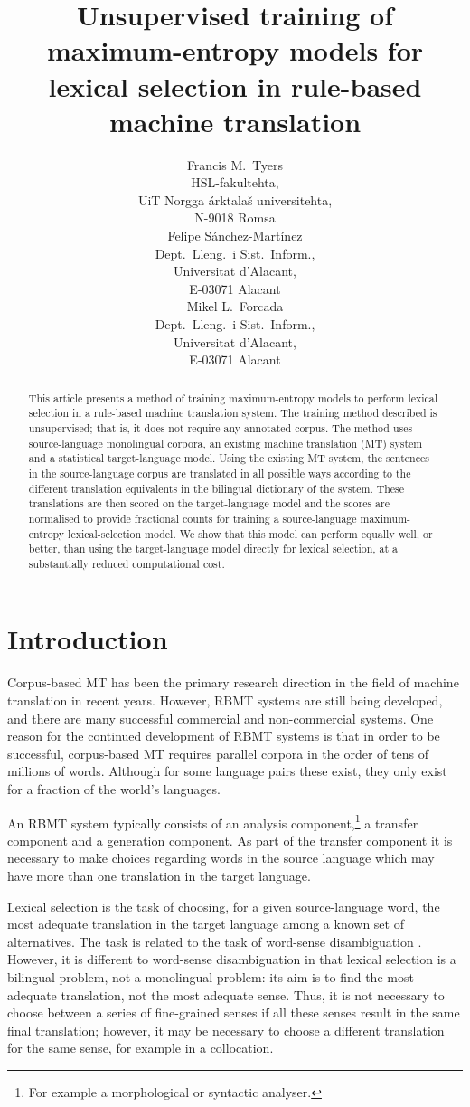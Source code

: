 \documentclass[11pt]{article}
\title{Unsupervised training of maximum-entropy models for lexical
    selection in rule-based machine translation}
\author{
 Francis M.\ Tyers \\
 HSL-fakultehta, \\
 UiT Norgga \'{a}rktala\v{s} universitehta, \\
 N-9018 Romsa \\
 \And
 Felipe S\'anchez-Mart\'inez \\
 Dept.\ Lleng.\ i Sist.\ Inform., \\
 Universitat d'Alacant,\\
 E-03071 Alacant\\
 \And
 Mikel L.\ Forcada \\
 Dept.\ Lleng.\ i Sist.\ Inform., \\
 Universitat d'Alacant,\\
 E-03071 Alacant\\
}
\date{}
\begin{document}
\maketitle


\begin{abstract}
  This article presents a method of training maximum-entropy models to
  perform lexical selection in a rule-based machine translation
  system. The training method described is unsupervised; that is, it
  does not require any annotated corpus. The method uses
  source-language monolingual corpora, an existing machine translation
  (MT) system and a statistical target-language model. Using the
  existing MT system, the sentences in the source-language corpus are
  translated in all possible ways according to the different
  translation equivalents in the bilingual dictionary of the system.
  These translations are then scored on the target-language model and
  the scores are normalised to provide fractional counts for training
  a source-language maximum-entropy lexical-selection model. We show
  that this model can perform equally well, or better, than using the
  target-language model directly for lexical selection, at a
  substantially reduced computational cost.
\end{abstract}


\section{Introduction}

Corpus-based MT has been the primary research direction in the field 
of machine translation in recent years. However, RBMT systems are 
still being developed, and there are many successful commercial 
and non-commercial systems. One reason for the continued development
of RBMT systems is that in order to be successful, corpus-based MT requires parallel corpora in
the order of tens of millions of words. Although for some language
pairs these exist, they only exist for a fraction of the 
world's languages. 

An RBMT system typically consists of an analysis component,\footnote{For example
a morphological or syntactic analyser.} a transfer
component and a generation component. As part of the transfer component
it is necessary to make choices regarding words in the source language
which may have more than one translation in the target language.

Lexical selection is the task of choosing, for a given source-language
word, the most adequate translation in the target language among a
known set of alternatives.  The task is related to the task of
word-sense disambiguation \citep{ide98a}. However, it is different to
word-sense disambiguation in that lexical selection is a bilingual
problem, not a monolingual problem: its aim is to find the most
adequate translation, not the most adequate sense. Thus, it is not
necessary to choose between a series of fine-grained senses if all
these senses result in the same final translation; however, it may be
necessary to choose a different translation for the same sense, for
example in a collocation.
\end{document}
